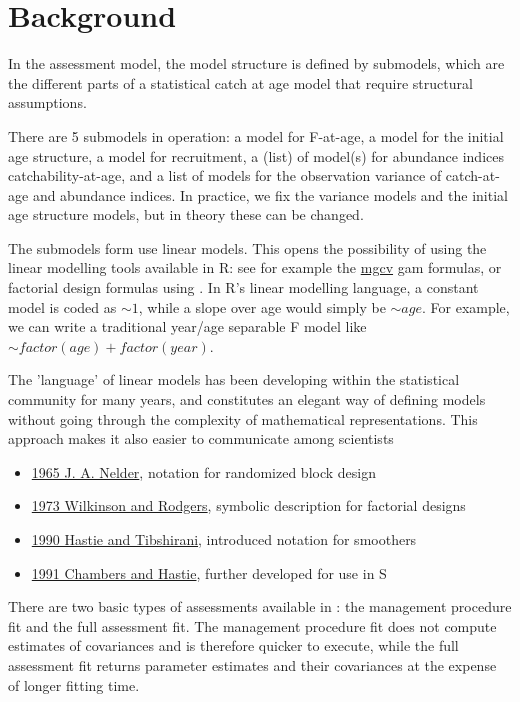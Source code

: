 \documentclass[a4paper,english,10pt]{article}\usepackage[]{graphicx}\usepackage[]{color}
\begin{document}
\section{Background}

In the \aFa assessment model, the model structure is defined by submodels, which are the different parts of a statistical catch at age model that require structural assumptions.

There are 5 submodels in operation: a model for F-at-age, a model for the initial age structure, a model for recruitment, a (list) of model(s) for abundance indices catchability-at-age, and a list of models for the observation variance of catch-at-age and abundance indices. In practice, we fix the variance models and the initial age structure models, but in theory these can be changed.

The submodels form use linear models. This opens the possibility of using the linear modelling tools available in R: see for example the \href{http://cran.r-project.org/web/packages/mgcv/index.html}{mgcv} gam formulas, or factorial design formulas using . In R's linear modelling language, a constant model is coded as $\sim 1$, while a slope over age would simply be $\sim age$. For example, we can write a traditional year/age separable F model like $\sim factor(age) + factor(year)$.

The 'language' of linear models has been developing within the statistical community for many years, and constitutes an elegant way of defining models without going through the complexity of mathematical representations. This approach makes it also easier to communicate among scientists 
  \begin{itemize}
  \item \href{http://rspa.royalsocietypublishing.org/content/283/1393/147.short}{1965 J. A. Nelder}, notation for randomized block design
  \item \href{http://www.jstor.org/stable/info/2346786}{1973 Wilkinson and Rodgers}, symbolic description for factorial designs
  \item \href{http://books.google.com/books?isbn=0412343908}{1990 Hastie and Tibshirani}, introduced notation for smoothers
  \item \href{http://books.google.com/books?isbn=041283040X}{1991 Chambers and Hastie}, further developed for use in S
  \end{itemize}

There are two basic types of assessments available in \aFa: the management procedure fit and the full assessment fit. The management procedure fit does not compute estimates of covariances and is therefore quicker to execute, while the full assessment fit returns parameter estimates and their covariances at the expense of longer fitting time.
\end{document}
